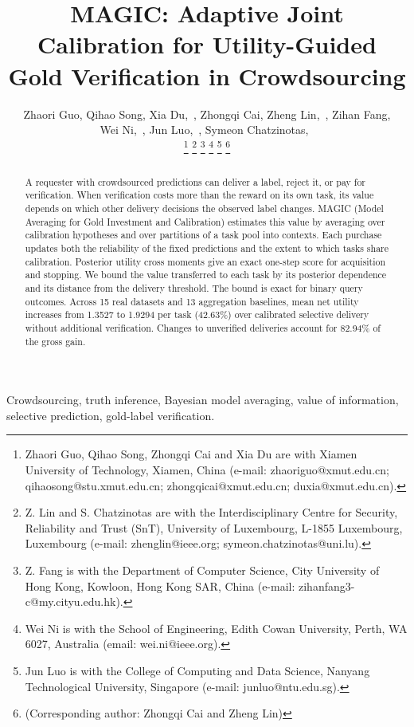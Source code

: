 \documentclass[journal]{IEEEtran}
\begin{document}
\title{MAGIC: Adaptive Joint Calibration for Utility-Guided Gold Verification in Crowdsourcing}
\author{ Zhaori Guo, Qihao Song, Xia Du,~, Zhongqi Cai, Zheng Lin,~, Zihan Fang, \\Wei Ni,~, Jun Luo,~, Symeon Chatzinotas,~ 


\thanks{Zhaori Guo, Qihao Song, Zhongqi Cai and Xia Du are with Xiamen University of Technology, Xiamen, China (e-mail: zhaoriguo@xmut.edu.cn; qihaosong@stu.xmut.edu.cn; zhongqicai@xmut.edu.cn; duxia@xmut.edu.cn).}%
\thanks{Z. Lin and S. Chatzinotas are with the Interdisciplinary Centre for Security, Reliability and Trust (SnT), University of Luxembourg, L-1855 Luxembourg, Luxembourg (e-mail: zhenglin@ieee.org; symeon.chatzinotas@uni.lu).}
\thanks{Z. Fang is with the Department of Computer Science, City University of Hong Kong, Kowloon, Hong Kong SAR, China (e-mail: zihanfang3-c@my.cityu.edu.hk).}
\thanks{Wei Ni is with the School of Engineering, Edith Cowan University, Perth, WA 6027, Australia (email: wei.ni@ieee.org).}
\thanks{Jun Luo is with the College of Computing
and Data Science, Nanyang Technological University, Singapore (e-mail: junluo@ntu.edu.sg).}
\thanks{(Corresponding author: Zhongqi Cai and Zheng Lin)}%
}
\maketitle
\begin{abstract}
A requester with crowdsourced predictions can deliver a label, reject it, or pay for verification. When verification costs more than the reward on its own task, its value depends on which other delivery decisions the observed label changes. MAGIC (Model Averaging for Gold Investment and Calibration) estimates this value by averaging over calibration hypotheses and over partitions of a task pool into contexts. Each purchase updates both the reliability of the fixed predictions and the extent to which tasks share calibration. Posterior utility cross moments give an exact one-step score for acquisition and stopping. We bound the value transferred to each task by its posterior dependence and its distance from the delivery threshold. The bound is exact for binary query outcomes. Across 15 real datasets and 13 aggregation baselines, mean net utility increases from 1.3527 to 1.9294 per task (42.63\%) over calibrated selective delivery without additional verification. Changes to unverified deliveries account for 82.94\% of the gross gain.
\end{abstract}
\begin{IEEEkeywords}
Crowdsourcing, truth inference, Bayesian model averaging, value of information, selective prediction, gold-label verification.
\end{IEEEkeywords}
\end{document}
